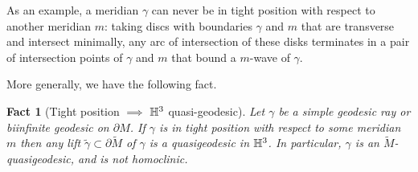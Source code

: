 \documentclass[12pt]{amsart}
\newtheorem{fact}[theorem]{Fact}
\theoremstyle{definition}
\theoremstyle{remark}
\newcommand{\note}[1]{\marginpar{\tiny \raggedright \color{red} #1 }}
\begin{document}

 As an example, a meridian $\gamma $ can never be in tight position with respect to  another meridian $m$: taking discs with boundaries $\gamma$ and $m$ that are transverse and intersect minimally, any arc of intersection of these disks terminates in a pair of intersection points of $\gamma$ and $m$  that bound a $m$-wave of  $\gamma$.  

More generally,  we have the following fact.

\begin{fact}[Tight position $\implies$ $\mathbb H^3$ quasi-geodesic] \label {tightquasi} 
Let  $\gamma $  be a simple geodesic ray or biinfinite geodesic on $\partial M$. If $\gamma$  is in tight position with respect to some meridian $m$ then  any lift $\tilde \gamma \subset \partial \tilde M $ of $\gamma$ is a quasigeodesic in $\mathbb H^3$. In particular, $\gamma$ is an $\tilde M$-quasigeodesic, and is not homoclinic.\end{fact}

\end{document}
